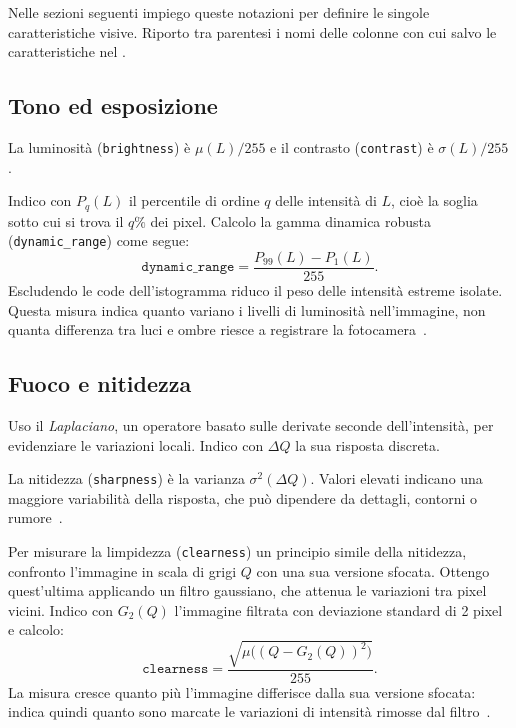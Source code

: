Nelle sezioni seguenti impiego queste notazioni per definire le singole caratteristiche visive. Riporto tra parentesi i nomi delle colonne con cui salvo le caratteristiche nel .

\subsection{Tono ed esposizione}
\label{subsec:feature-tono}

La luminosità (\texttt{brightness}) è $\mu(L)/255$ e il contrasto (\texttt{contrast}) è $\sigma(L)/255$.

Indico con $P_q(L)$ il percentile di ordine $q$ delle intensità di $L$, cioè la soglia sotto cui si trova il $q\%$ dei pixel. Calcolo la gamma dinamica robusta (\texttt{dynamic\_range}) come segue:
\begin{equation}
    \texttt{dynamic\_range}=\frac{P_{99}(L)-P_1(L)}{255}.
    \label{eq:feature-gamma-dinamica}
\end{equation}
Escludendo le code dell'istogramma riduco il peso delle intensità estreme isolate. Questa misura indica quanto variano i livelli di luminosità nell’immagine, non quanta differenza tra luci e ombre riesce a registrare la fotocamera~\cite{1640788}.

\subsection{Fuoco e nitidezza}
\label{subsec:feature-fuoco}

Uso il \emph{Laplaciano}, un operatore basato sulle derivate seconde dell'intensità, per evidenziare le variazioni locali. Indico con $\Delta Q$ la sua risposta discreta.

La nitidezza (\texttt{sharpness}) è la varianza $\sigma^2(\Delta Q)$. Valori elevati indicano una maggiore variabilità della risposta, che può dipendere da dettagli, contorni o rumore~\cite{903548}.

Per misurare la limpidezza (\texttt{clearness}) un principio simile della nitidezza, confronto l'immagine in scala di grigi $Q$ con una sua versione sfocata. Ottengo quest'ultima applicando un filtro gaussiano, che attenua le variazioni tra pixel vicini. Indico con $G_2(Q)$ l'immagine filtrata con deviazione standard di 2 pixel e calcolo:
\begin{equation}
    \texttt{clearness}=\frac{\sqrt{\mu\bigl((Q-G_2(Q))^2\bigr)}}{255}.
\end{equation}
La misura cresce quanto più l'immagine differisce dalla sua versione sfocata: indica quindi quanto sono marcate le variazioni di intensità rimosse dal filtro~\cite{PERTUZ20131415}.

